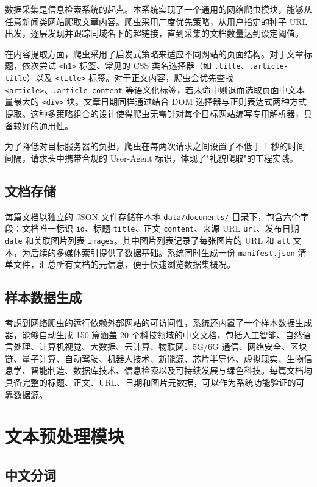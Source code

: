 \documentclass[12pt, a4paper]{ctexart}
\begin{document}
数据采集是信息检索系统的起点。本系统实现了一个通用的网络爬虫模块，能够从任意新闻类网站爬取文章内容。爬虫采用广度优先策略，从用户指定的种子 URL 出发，逐层发现并跟踪同域名下的超链接，直到采集的文档数量达到设定阈值。

在内容提取方面，爬虫采用了启发式策略来适应不同网站的页面结构。对于文章标题，依次尝试 \texttt{<h1>} 标签、常见的 CSS 类名选择器（如 \texttt{.title}、\texttt{.article-title}）以及 \texttt{<title>} 标签。对于正文内容，爬虫会优先查找 \texttt{<article>}、\texttt{.article-content} 等语义化标签，若未命中则退而选取页面中文本量最大的 \texttt{<div>} 块。文章日期同样通过结合 DOM 选择器与正则表达式两种方式提取。这种多策略组合的设计使得爬虫无需针对每个目标网站编写专用解析器，具备较好的通用性。

为了降低对目标服务器的负担，爬虫在每两次请求之间设置了不低于 1 秒的时间间隔，请求头中携带合规的 User-Agent 标识，体现了"礼貌爬取"的工程实践。

\subsection{文档存储}

每篇文档以独立的 JSON 文件存储在本地 \texttt{data/documents/} 目录下，包含六个字段：文档唯一标识 \texttt{id}、标题 \texttt{title}、正文 \texttt{content}、来源 URL \texttt{url}、发布日期 \texttt{date} 和关联图片列表 \texttt{images}。其中图片列表记录了每张图片的 URL 和 \texttt{alt} 文本，为后续的多媒体索引提供了数据基础。系统同时生成一份 \texttt{manifest.json} 清单文件，汇总所有文档的元信息，便于快速浏览数据集概况。

\subsection{样本数据生成}

考虑到网络爬虫的运行依赖外部网站的可访问性，系统还内置了一个样本数据生成器，能够自动生成 150 篇涵盖 20 个科技领域的中文文档，包括人工智能、自然语言处理、计算机视觉、大数据、云计算、物联网、5G/6G 通信、网络安全、区块链、量子计算、自动驾驶、机器人技术、新能源、芯片半导体、虚拟现实、生物信息学、智能制造、数据库技术、信息检索以及可持续发展与绿色科技。每篇文档均具备完整的标题、正文、URL、日期和图片元数据，可以作为系统功能验证的可靠数据源。


\section{文本预处理模块}

\subsection{中文分词}
\end{document}
